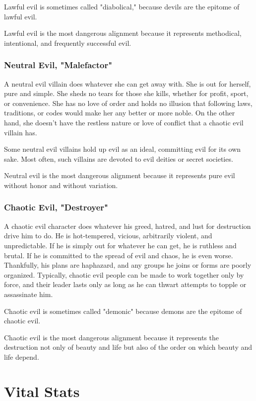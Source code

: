Lawful evil is sometimes called "diabolical," because devils are the epitome 
of lawful evil.

Lawful evil is the most dangerous alignment because it represents methodical, intentional, 
and frequently successful evil.

\subsubsection{Neutral Evil, "Malefactor"}
A neutral evil villain does whatever she 
can get away with. She is out for herself, pure and simple. She sheds no tears 
for those she kills, whether for profit, sport, or convenience. She has no love 
of order and holds no illusion that following laws, traditions, or codes would 
make her any better or more noble. On the other hand, she doesn't have the restless 
nature or love of conflict that a chaotic evil villain has.

Some neutral evil villains hold up evil as an ideal, committing evil for its own 
sake. Most often, such villains are devoted to evil deities or secret societies.

Neutral evil is the most dangerous alignment because it represents pure evil without 
honor and without variation.

\subsubsection{Chaotic Evil, "Destroyer"}
A chaotic evil character does whatever his 
greed, hatred, and lust for destruction drive him to do. He is hot-tempered, vicious, 
arbitrarily violent, and unpredictable. If he is simply out for whatever he can 
get, he is ruthless and brutal. If he is committed to the spread of evil and chaos, 
he is even worse. Thankfully, his plans are haphazard, and any groups he joins 
or forms are poorly organized. Typically, chaotic evil people can be made to work 
together only by force, and their leader lasts only as long as he can thwart attempts 
to topple or assassinate him.

Chaotic evil is sometimes called "demonic" because demons are the epitome of 
chaotic evil.

Chaotic evil is the most dangerous alignment because it represents the destruction 
not only of beauty and life but also of the order on which beauty and life depend.

\section{Vital Stats}

